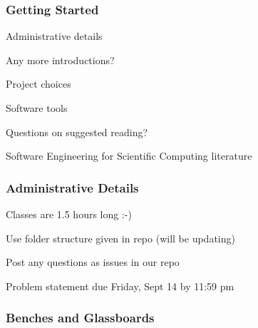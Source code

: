 \documentclass[t,12pt,numbers,fleqn]{beamer}
\begin{document}




\begin{frame}
\frametitle{Getting Started}

\bi
\item Administrative details
\item Any more introductions?
\item Project choices
\item Software tools
\item Questions on suggested reading?
\item Software Engineering for Scientific Computing literature
\ei

\end{frame}


\begin{frame}
\frametitle{Administrative Details}

\bi
\item Classes are 1.5 hours long  :-)
\item Use folder structure given in repo (will be updating)
\item Post any questions as issues in our repo
\item Problem statement due Friday, Sept 14 by 11:59 pm
\ei

\end{frame}


\begin{frame}
\frametitle{Benches and Glassboards}


\end{frame}

\end{document}
